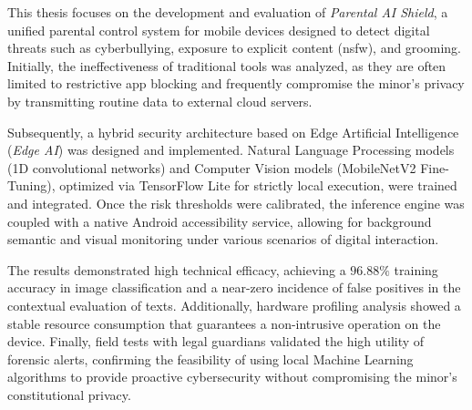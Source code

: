 This thesis focuses on the development and evaluation of \textit{Parental AI Shield}, a unified parental control system for mobile devices designed to detect digital threats such as cyberbullying, exposure to explicit content (\gls{nsfw}), and grooming. Initially, the ineffectiveness of traditional tools was analyzed, as they are often limited to restrictive app blocking and frequently compromise the minor's privacy by transmitting routine data to external cloud servers.

Subsequently, a hybrid security architecture based on Edge Artificial Intelligence (\textit{Edge AI}) was designed and implemented. Natural Language Processing models (1D convolutional networks) and Computer Vision models (MobileNetV2 Fine-Tuning), optimized via TensorFlow Lite for strictly local execution, were trained and integrated. Once the risk thresholds were calibrated, the inference engine was coupled with a native Android accessibility service, allowing for background semantic and visual monitoring under various scenarios of digital interaction.

The results demonstrated high technical efficacy, achieving a $96.88\%$ training accuracy in image classification and a near-zero incidence of false positives in the contextual evaluation of texts. Additionally, hardware profiling analysis showed a stable resource consumption that guarantees a non-intrusive operation on the device. Finally, field tests with legal guardians validated the high utility of forensic alerts, confirming the feasibility of using local Machine Learning algorithms to provide proactive cybersecurity without compromising the minor's constitutional privacy.


\MediaOptionLogicBlank